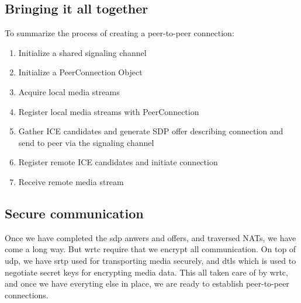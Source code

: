 \subsection{Bringing it all together}
To summarize the process of creating a peer-to-peer connection:

\begin{enumerate}
\item{Initialize a shared signaling channel}
\item{Initialize a PeerConnection Object}
\item{Acquire local media streams}
\item{Register local media streams with PeerConnection}
\item{Gather ICE candidates and generate SDP offer describing connection and send to peer via the signaling channel}
\item{Register remote ICE candidates and initiate connection}
\item{Receive remote media stream}
\end{enumerate} 


\subsection{Secure communication}
Once we have completed the \gls{sdp} anwers and offers, and traversed NATs, we have come a long way. But \gls{wrtc} require that we encrypt all communication. On top of \gls{udp}, we have \gls{srtp} used for transporting media securely, and \gls{dtls} which is used to negotiate secret keys for encrypting media data. This all taken care of by \gls{wrtc}, and once we have everyting else in place, we are ready to establish peer-to-peer connections.
